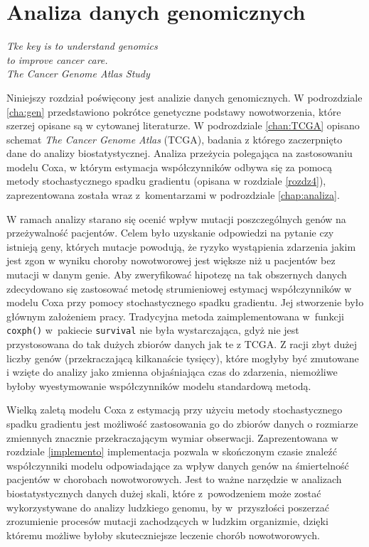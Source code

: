 \chapter{Analiza danych genomicznych}\label{chap5}
\begin{flushright}
\textit{Tke key is to understand genomics \\
to improve cancer care. \\
The Cancer Genome Atlas Study
}
\end{flushright}

Niniejszy rozdział poświęcony jest analizie danych genomicznych. W podrozdziale \ref{cha:gen} przedstawiono pokrótce genetyczne podstawy nowotworzenia, które szerzej opisane są w cytowanej literaturze. W podrozdziale \ref{chan:TCGA} opisano schemat \textit{The Cancer Genome Atlas} (TCGA), badania z którego zaczerpnięto dane do analizy biostatystycznej. Analiza przeżycia polegająca na zastosowaniu modelu Coxa, w którym estymacja współczynników odbywa się za pomocą metody stochastycznego spadku gradientu (opisana w rozdziale \ref{rozdz4}), zaprezentowana została wraz z~komentarzami w podrozdziale \ref{chap:analiza}. 

W ramach analizy starano się ocenić wpływ mutacji poszczególnych genów na przeżywalność pacjentów. Celem było uzyskanie odpowiedzi na pytanie czy istnieją geny, których mutacje powodują, że ryzyko wystąpienia zdarzenia jakim jest zgon w wyniku choroby nowotworowej jest większe niż u pacjentów bez mutacji w danym genie. Aby zweryfikować hipotezę na tak obszernych danych zdecydowano się zastosować metodę strumieniowej estymacj współczynników w modelu Coxa przy pomocy stochastycznego spadku gradientu. Jej stworzenie było głównym założeniem pracy. Tradycyjna metoda zaimplementowana w~funkcji \texttt{coxph()} w~pakiecie \texttt{survival} \citep{survival} nie była wystarczająca, gdyż nie jest przystosowana do tak dużych zbiorów danych jak te z TCGA. Z racji zbyt dużej liczby genów (przekraczającą kilkanaście tysięcy), które mogłyby być zmutowane i wzięte do analizy jako zmienna objaśniająca czas do zdarzenia, niemożliwe byłoby wyestymowanie współczynników modelu standardową metodą.

Wielką zaletą modelu Coxa z estymacją przy użyciu metody stochastycznego spadku gradientu jest możliwość zastosowania go do zbiorów danych o rozmiarze zmiennych znacznie przekraczającym wymiar obserwacji. Zaprezentowana w rozdziale \ref{implemento} implementacja pozwala w skończonym czasie znaleźć współczynniki modelu odpowiadające za wpływ danych genów na śmiertelność pacjentów w chorobach nowotworowych. Jest to ważne narzędzie w analizach biostatystycznych danych dużej skali, które z~powodzeniem może zostać wykorzystywane do analizy ludzkiego genomu, by w~przyszłości poszerzać zrozumienie procesów mutacji zachodzących w ludzkim organizmie, dzięki któremu możliwe byłoby skuteczniejsze leczenie chorób nowotworowych.

